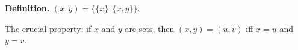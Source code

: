 \textbf{Definition.} $(x,y) = \{\{x\}, \{x, y\}\}$.

The crucial property: if $x$ and $y$ are sets, then $(x,y) = (u,v)$ iff $x = u$ and $y = v$.
